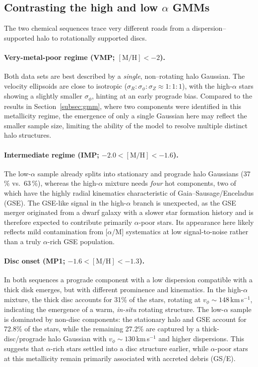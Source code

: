 \documentclass[a4paper,12pt]{article}
\begin{document}
\subsection{Contrasting the high and low $\alpha$ GMMs}
\label{subsec:gmm_comparison}

The two chemical sequences trace very different roads from a dispersion–supported halo to
rotationally supported discs.

\paragraph{Very-metal-poor regime (VMP; $[\mathrm{M/H}]<-2$).}
Both data sets are best described by a \emph{single}, non–rotating halo Gaussian.
The velocity ellipsoids are close to isotropic
($\sigma_{R}\!:\!\sigma_{\phi}\!:\!\sigma_{Z}\!\approx\!1\!:\!1\!:\!1$),
with the high-$\alpha$ stars showing a slightly smaller
$\sigma_{\phi}$, hinting at an early prograde bias.
Compared to the results in Section~\ref{subsec:gmm}, where two components were
 identified in this metallicity regime, the emergence of only a single Gaussian 
 here may reflect the smaller sample size, limiting the ability of the model to 
 resolve multiple distinct halo structures.


\paragraph{Intermediate regime (IMP; $-2.0<[\mathrm{M/H}]<-1.6$).}
The low-$\alpha$ sample already splits into stationary and prograde halo
Gaussians (37\,\% vs.\ 63\,\%), whereas the high-$\alpha$ mixture needs
\textit{four} hot components, two of which have the highly radial kinematics
characteristic of Gaia–Sausage/Enceladus (GSE).
The GSE-like signal in the high-$\alpha$ branch is unexpected, as the GSE merger
originated from a dwarf galaxy with a slower star formation history and is 
therefore expected to contribute primarily $\alpha$-poor stars. 
Its appearance here likely reflects mild contamination from \mbox{[$\alpha$/M]} 
systematics at low signal-to-noise rather than a truly $\alpha$-rich GSE population.


\paragraph{Disc onset (MP1; $-1.6<[\mathrm{M/H}]<-1.3$).}
In both sequences a prograde component with a low dispersion compatible with a thick disk emerges, 
but with different prominence and kinematics.  
In the high-$\alpha$ mixture, the thick disc accounts for 31\% of the stars, rotating at 
$v_{\phi}\!\sim\!148$\,km\,s$^{-1}$, indicating the emergence of a warm, 
\textit{in-situ} rotating structure.  
The low-$\alpha$ sample is dominated by non-disc components: the stationary halo and GSE account for 72.8\% 
of the stars, while the remaining 27.2\% are captured by a thick-disc/prograde halo Gaussian with 
$v_{\phi}\!\sim\!130$\,km\,s$^{-1}$ and higher dispersions.  
This suggests that $\alpha$-rich stars settled into a disc structure earlier, while $\alpha$-poor stars at this 
metallicity remain primarily associated with accreted debris (GS/E).
\end{document}
